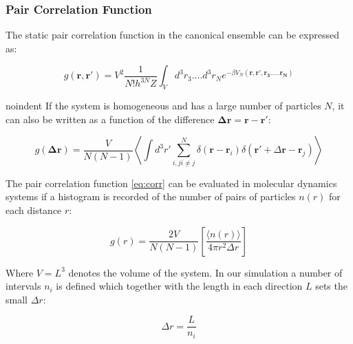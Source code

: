 \documentclass[
10pt, %
a4paper, %
oneside, %
headinclude,footinclude, %
BCOR5mm, %
]{scrartcl}
\newcommand{\insertcode}[2]{\begin{itemize}\item[]\end{itemize}} %
\begin{document}


\subsubsection{Pair Correlation Function}

The static pair correlation function in the canonical ensemble can be expressed as:

\begin{equation} g(\mathbf{r,r'}) = V^2 \frac{1}{N!h^{3N}Z} \int_V d^3r_3....d^3r_N e^{-\beta V_N(\mathbf{r,r',r_3.....r_N})} \end{equation}

noindent
If the system is homogeneous and has a large number of particles $N$, it can also be written as a function of the difference $\mathbf{\Delta r} = \mathbf{r} - \mathbf{r'}$:

\begin{equation} g(\mathbf{\Delta r}) = \frac{V}{N(N-1)}  \left \langle \int d^3r' \sum_{i,j i \neq j}^N \delta(\mathbf{r}-\mathbf{r}_i) \delta(\mathbf{r'} + \Delta\mathbf{r} - \mathbf{r}_j) \right \rangle \end{equation}

The pair correlation function \ref{eq:corr} can be evaluated in molecular dynamics systems  if a histogram is recorded of the number of pairs of particles $n(r)$ for each distance $r$: 

\begin{equation} 
g(r) = \frac{2V}{N(N-1)} \left [ \frac{\langle n(r) \rangle }{ 4 \pi r^2 \Delta r} \right ] 
\label{eq:corr}
\end{equation}

\noindent
Where $V = L^3$ denotes the volume of the system. In our simulation a number of intervals $n_i$ is defined which together with the length in each direction $L$ sets the small $\Delta r$:

\begin{equation} \Delta r  = \frac{L}{n_i} \end{equation}

\end{document}
